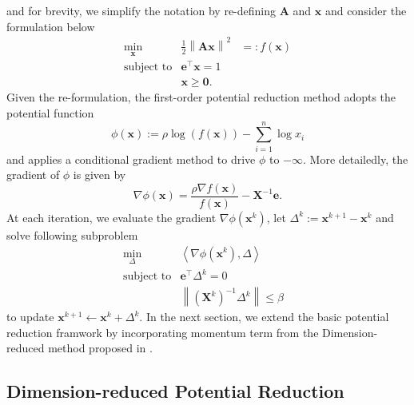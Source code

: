 \documentclass{article}
\newcommand{\assign}{:=}
\newcommand{\backassign}{=:}
\newcommand{\x}{\mathbf{x}}
\newcommand{\A}{\mathbf{A}}
\newcommand{\0}{\textbf{0}}
\newcommand{\e}{\mathbf{e}}
\newcommand{\n}{\nabla}
\newcommand{\X}{\mathbf{X}}
\begin{document}
and for brevity, we simplify the notation by re-defining $\A$ and $\x$ and
consider the formulation below
\begin{eqnarray*}
  \min_{\x} & \frac{1}{2} \left\| \A \x \right\|^2 & \backassign f \left( \x
  \right)\\
  \text{subject to} & \e^{\top} \x = 1 & \\
  & \x \geq \0 . & 
\end{eqnarray*}
Given the re-formulation, the first-order potential reduction method adopts
the potential function
\[ \phi \left( \x \right) \assign \rho \log \left( f \left( \x \right) \right)
   - \sum_{i = 1}^n \log x_i \]
and applies a conditional gradient method to drive $\phi$ to $- \infty$. More
detailedly, the gradient of $\phi$ is given by
\[ \n \phi \left( \x \right) = \frac{\rho \n f \left( \x \right)}{f \left( \x
   \right)} - \X^{- 1} \e . \]
At each iteration, we evaluate the gradient $\n \phi \left( \x^k \right)$, let
$\Delta^k \assign \x^{k + 1} - \x^k$ and solve following subproblem
\begin{eqnarray*}
  \min_{\Delta} & \left\langle \n \phi \left( \x^k \right), \Delta
  \right\rangle & \\
  \text{subject to} & \e^{\top} \Delta^k = 0 & \\
  & \left\| \left( \X^k \right)^{- 1} \Delta^k \right\| \leq \beta & 
\end{eqnarray*}
to update $\x^{k + 1} \leftarrow \x^k + \Delta^k$. In the next section, we
extend the basic potential reduction framwork by incorporating momentum term
from the Dimension-reduced method proposed in {\cite{zhang2022drsom}}.

\subsection{Dimension-reduced Potential Reduction}
\end{document}
